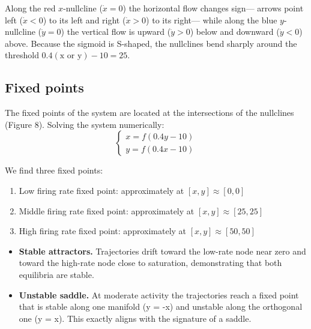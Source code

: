 \documentclass{article}
\begin{document}
Along the red \(x\)-nullcline (\(\dot{x}=0\)) the horizontal flow changes sign—
arrows point left (\(\dot{x}<0\)) to its left and right (\(\dot{x}>0\)) to its right—
while along the blue \(y\)-nullcline (\(\dot{y}=0\)) the vertical flow is upward
(\(\dot{y}>0\)) below and downward (\(\dot{y}<0\)) above.
Because the sigmoid is S-shaped, the nullclines bend sharply around the threshold
\(0.4(\text{x or y})-10=25\).
\subsection{Fixed points}
The fixed points of the system are located at the intersections of the nullclines (Figure 8). Solving the system numerically:
\begin{equation}
\begin{cases}
x = f(0.4y - 10)\\
y = f(0.4x - 10)
\end{cases}
\end{equation}

We find three fixed points:
\begin{enumerate}
    \item Low firing rate fixed point: approximately at $[x, y] \approx [0, 0]$
    \item Middle firing rate fixed point: approximately at $[x, y] \approx [25, 25]$
    \item High firing rate fixed point: approximately at $[x, y] \approx [50, 50]$
\end{enumerate}


\begin{itemize}
    \item \textbf{Stable attractors.}  Trajectories drift toward the low-rate node near zero and toward the high-rate node close to saturation, demonstrating that both equilibria are stable.
    \item \textbf{Unstable saddle.} At moderate activity the trajectories reach a fixed point that is stable along one manifold (y = -x) and unstable along the orthogonal one (y = x). This exactly aligns with the signature of a saddle.
  \end{itemize}
  
\end{document}
